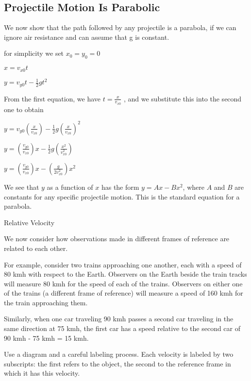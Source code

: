 \documentclass{extarticle}
\begin{document}
\subsection{Projectile Motion Is Parabolic}

 We now show that the path followed by any projectile is a parabola, if we can ignore air resistance and can assume that g is constant. 
 
 for simplicity we set $x_0 = y_0 = 0$
 
 
$x = v_{x0}t $

$y = v_{y0}t - \frac{1}{2}gt^2$ 
 
From the first equation, we have $t = \frac{x}{v_{x0}}$ , and we substitute this into the second one to obtain
 
$y = v_{y0}(\frac{x}{v_{x0}}) - \frac{1}{2}g(\frac{x}{v_{x0}})^2$ 

$y = (\frac{v_{y0}}{v_{x0}})x - \frac{1}{2}g(\frac{x^2}{v_{x0}^2})$ 

$y = (\frac{v_{y0}}{v_{x0}})x - (\frac{g}{2v_{x0}^2})x^2$

We see that $y$ as a function of $x$ has the form $y = Ax - Bx^2$, where $A$ and $B$ are constants for any specific projectile motion. This is the standard equation for a parabola.















\markStart[100]

Relative Velocity

We now consider how observations made in different frames of reference are related to each other.

For example, consider two trains approaching one another, each with a speed of 80 kmh with respect to the Earth.
Observers on the Earth beside the train tracks will measure 80 kmh for the speed of each of the trains.
Observers on either one of the trains (a different frame of reference) will measure a speed of 160 kmh for the train approaching them.

Similarly, when one car traveling 90 kmh passes a second car traveling in the same direction at 75 kmh, the first car has a speed relative to the second car of 90 kmh - 75 kmh = 15 kmh.


Use a diagram and a careful labeling process. Each velocity is labeled by two subscripts: the first refers to the object, the second to the reference frame in which it has this velocity.
\end{document}
